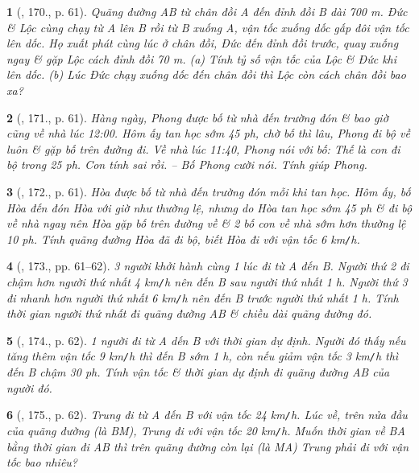 \documentclass{article}
\newtheorem{baitoan}{}
\begin{document}
\begin{baitoan}[\cite{Binh_Toan_6_tap_2}, 170., p. 61]
	Quãng đường AB từ chân đồi A đến đỉnh đồi B dài {\rm700 m}. Đức \& Lộc cùng chạy từ A lên B rồi từ B xuống A, vận tốc xuống dốc gấp đôi vận tốc lên dốc. Họ xuất phát cùng lúc ở chân đồi, Đức đến đỉnh đồi trước, quay xuống ngay \& gặp Lộc cách đỉnh đồi {\rm70 m}. (a) Tính tỷ số vận tốc của Lộc \& Đức khi lên dốc. (b) Lúc Đức chạy xuống dốc đến chân đồi thì Lộc còn cách chân đồi bao xa?
\end{baitoan}

\begin{baitoan}[\cite{Binh_Toan_6_tap_2}, 171., p. 61]
	Hàng ngày, Phong được bố từ nhà đến trường đón \& bao giờ cũng về nhà lúc {\rm12:00}. Hôm ấy tan học sớm {\rm45 ph}, chờ bố thì lâu, Phong đi bộ về luôn \& gặp bố trên đường đi. Về nhà lúc {\rm11:40}, Phong nói với bố: Thế là con đi bộ trong {\rm25 ph}. Con tính sai rồi. -- Bố Phong cười nói. Tính giúp Phong.
\end{baitoan}

\begin{baitoan}[\cite{Binh_Toan_6_tap_2}, 172., p. 61]
	Hòa được bố từ nhà đến trường đón mỗi khi tan học. Hôm ấy, bố Hòa đến đón Hòa với giờ như thường lệ, nhưng do Hòa tan học sớm {\rm45 ph} \& đi bộ về nhà ngay nên Hòa gặp bố trên đường về \& 2 bố con về nhà sớm hơn thường lệ {\rm10 ph}. Tính quãng đường Hòa đã đi bộ, biết Hòa đi với vận tốc {\rm6 km{\tt/}h}.
\end{baitoan}

\begin{baitoan}[\cite{Binh_Toan_6_tap_2}, 173., pp. 61--62]
	3 người khởi hành cùng 1 lúc đi từ A đến B. Người thứ 2 đi chậm hơn người thứ nhất {\rm4 km{\tt/}h} nên đến B sau người thứ nhất {\rm1 h}. Người thứ 3 đi nhanh hơn người thứ nhất {\rm6 km{\tt/}h} nên đến B trước người thứ nhất {\rm1 h}. Tính thời gian người thứ nhất đi quãng đường AB \& chiều dài quãng đường đó.
\end{baitoan}

\begin{baitoan}[\cite{Binh_Toan_6_tap_2}, 174., p. 62]
	1 người đi từ A dến B với thời gian dự định. Người đó thấy nếu tăng thêm vận tốc {\rm9 km{\tt/}h} thì đến B sớm {\rm1 h}, còn nếu giảm vận tốc {\rm3 km{\tt/}h} thì đến B chậm {\rm30 ph}. Tính vận tốc \& thời gian dự định đi quãng đường AB của người đó.
\end{baitoan}

\begin{baitoan}[\cite{Binh_Toan_6_tap_2}, 175., p. 62]
	Trung đi từ A đến B với vận tốc {\rm24 km{\tt/}h}. Lúc về, trên nửa đầu của quãng đường (là BM), Trung đi với vận tốc {\rm20 km{\tt/}h}. Muốn thời gian về BA bằng thời gian đi AB thì trên quãng đường còn lại (là MA) Trung phải đi với vận tốc bao nhiêu?
\end{baitoan}
\end{document}
